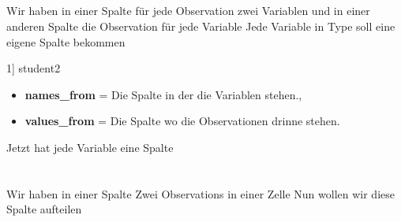 \subsection{}
Wir haben in einer Spalte für jede Observation zwei Variablen und in einer anderen Spalte die Observation für jede Variable
Jede Variable in Type soll eine eigene Spalte bekommen
\begin{rcode}{1]}
student2 %
\end{rcode}
\begin{itemize}[noitemsep]
  \item \textbf{names\_from} = Die Spalte in der die Variablen stehen.,
  \item \textbf{values\_from} = Die Spalte wo die Observationen drinne stehen.
\end{itemize}
Jetzt hat jede Variable eine Spalte
\newpage
\section{}
Wir haben in einer Spalte Zwei Observations in einer Zelle
Nun wollen wir diese Spalte aufteilen


